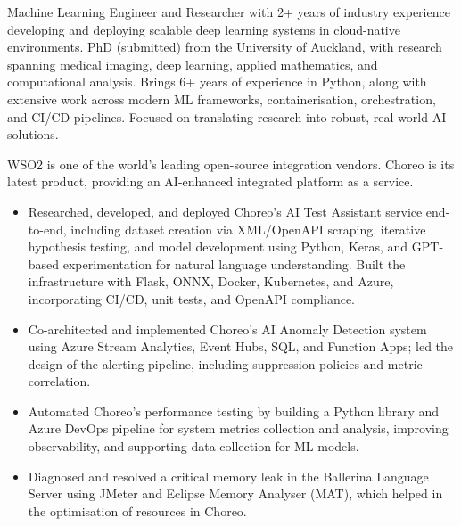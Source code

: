 \documentclass[12pt,a4paper,withhyper]{altacv}
\begin{document}


\makecvheader{}

\medskip


Machine Learning Engineer and Researcher with 2+ years of industry experience developing and deploying scalable deep learning systems in cloud-native environments. PhD (submitted) from the University of Auckland, with research spanning medical imaging, deep learning, applied mathematics, and computational analysis. Brings 6+ years of experience in Python, along with extensive work across modern ML frameworks, containerisation, orchestration, and CI/CD pipelines. Focused on translating research into robust, real-world AI solutions.

\medskip


WSO2 is one of the world's leading open-source integration vendors. Choreo is its latest product, providing an AI-enhanced integrated platform as a service.
\medskip
\begin{itemize} 
    \item Researched, developed, and deployed Choreo’s AI Test Assistant service end-to-end, including dataset creation via XML/OpenAPI scraping, iterative hypothesis testing, and model development using Python, Keras, and GPT-based experimentation for natural language understanding. Built the infrastructure with Flask, ONNX, Docker, Kubernetes, and Azure, incorporating CI/CD, unit tests, and OpenAPI compliance.
    \item Co-architected and implemented Choreo’s AI Anomaly Detection system using Azure Stream Analytics, Event Hubs, SQL, and Function Apps; led the design of the alerting pipeline, including suppression policies and metric correlation.
    \item Automated Choreo’s performance testing by building a Python library and Azure DevOps pipeline for system metrics collection and analysis, improving observability, and supporting data collection for ML models.
    \item Diagnosed and resolved a critical memory leak in the Ballerina Language Server using JMeter and Eclipse Memory Analyser (MAT), which helped in the optimisation of resources in Choreo.
\end{itemize}
\end{document}
